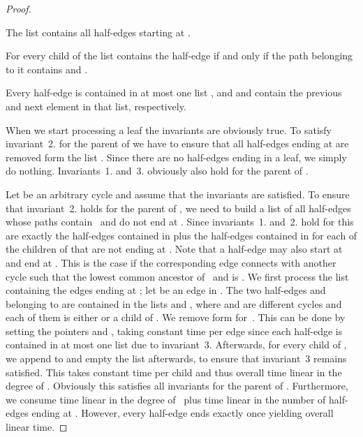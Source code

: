 \documentclass{scrartcl}
\newcommand{\1}[1]{{\normalfont \ensuremath{#1^{\tiny\circled{1}}}}} \newcommand{\2}[1]{{\normalfont \ensuremath{#1^{\tiny\circled{2}}}}} \renewcommand{\k}[1]{{\normalfont \ensuremath{#1^{\tiny\circled{k}}}}} \newcommand{\proj}[2]{\ensuremath{\left.#1\right|_{#2}}} \newcommand{\eps}{\varepsilon}
\theoremstyle{plain} \newtheorem{theorem}{Theorem} \newcounter{lemmacounter} \setcounter{lemmacounter}{0} \newtheorem{lemma}[lemmacounter]{Lemma} \newtheorem{fact}{Fact}  \newtheorem{corollary}{Corollary} \theoremstyle{definition} \newtheorem{definition}{Definition}
\begin{document}
\begin{proof}
\begin{compactenum}
  \item The list  contains all half-edges starting at .
  \item For every child  of  the list  contains the
    half-edge  if and only if the path belonging to it
    contains  and .
  \item Every half-edge  is contained in at most one list
    , and  and  contain the
    previous and next element in that list, respectively.
  \end{compactenum}
  When we start processing a leaf  the invariants are obviously
  true.  To satisfy invariant~2. for the parent of  we have to
  ensure that all half-edges ending at  are removed form the list
  .  Since there are no half-edges ending in a leaf, we
  simply do nothing.  Invariants~1. and~3. obviously also hold for the
  parent of .

  Let  be an arbitrary cycle and assume that the invariants are
  satisfied.  To ensure that invariant~2. holds for the parent of
  , we need to build a list of all half-edges whose paths
  contain~ and do not end at .  Since invariants~1. and~2. hold
  for  this are exactly the half-edges contained in  plus
  the half-edges contained in  for each of the children
   of  that are not ending at .  Note that a half-edge may
  also start at  and end at .  This is the case if the
  corresponding edge connects  with another cycle  such that
  the lowest common ancestor of~ and  is .  We first
  process the list  containing the edges ending at ; let
   be an edge in .  The two half-edges  and
   belonging to  are contained in the lists 
  and , where  and  are different cycles and
  each of them is either  or a child of .  We remove 
  form  for~.  This can be done by setting the
  pointers  and
  , taking constant time per
  edge since each half-edge is contained in at most one list due to
  invariant~3.  Afterwards, for every child  of , we append
   to  and empty the list  afterwards,
  to ensure that invariant~3 remains satisfied.  This takes constant
  time per child and thus overall time linear in the degree of .
  Obviously this satisfies all invariants for the parent of .
  Furthermore, we consume time linear in the degree of~ plus time
  linear in the number of half-edges ending at .  However, every
  half-edge ends exactly once yielding overall linear time.


\end{proof}
\end{document}

